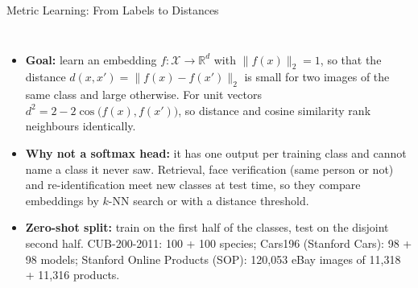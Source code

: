 \begin{frame}{Metric Learning: From Labels to Distances}
  \begin{columns}[T,onlytextwidth]
      \begin{itemize}\footnotesize\itemsep0.35em
        \item \textbf{Goal:} learn an embedding $f:\mathcal{X}\to\mathbb{R}^d$ with $\lVert f(x)\rVert_2=1$, so that the distance $d(x,x')=\lVert f(x)-f(x')\rVert_2$ is small for two images of the same class and large otherwise. For unit vectors $d^2=2-2\cos\big(f(x),f(x')\big)$, so distance and cosine similarity rank neighbours identically.
        \item \textbf{Why not a softmax head:} it has one output per training class and cannot name a class it never saw. Retrieval, face verification (same person or not) and re-identification meet new classes at test time, so they compare embeddings by $k$-NN search or with a distance threshold.
        \item \textbf{Zero-shot split:} train on the first half of the classes, test on the disjoint second half. CUB-200-2011: 100 + 100 species; Cars196 (Stanford Cars): 98 + 98 models; Stanford Online Products (SOP): 120{,}053 eBay images of 11{,}318 + 11{,}316 products.
      \end{itemize}
      \centering
      \vspace{0.2em}
\end{columns}
\end{frame}
